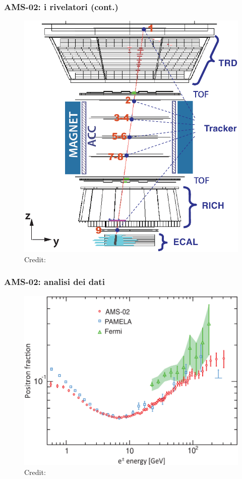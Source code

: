 \documentclass[10pt]{beamer}
\begin{document}
\begin{frame}
  \frametitle{AMS-02: i rivelatori (cont.)}
  \begin{figure}
    \centering
    \includegraphics[width=.5\columnwidth]{ams-rivelatori2}
    \caption{Credit: \textcite{2013PhRvL.110n1102A}}
  \end{figure}
\end{frame}

\begin{frame}
  \frametitle{AMS-02: analisi dei dati}
  \begin{figure}
    \centering
    \includegraphics[width=.7\columnwidth]{ams1}
    \caption{Credit: \textcite{2013PhRvL.110n1102A}}
  \end{figure}
\end{frame}
\end{document}
